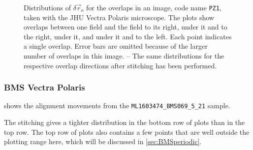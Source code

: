 \documentclass{article}
\begin{document}
\begin{figure}[ht]
\begin{subfigure}{0.24\linewidth}
		\caption{}
		\label{fig:stitchresultJHUPolaris1}
	\end{subfigure}
	\caption{Distributions of $\delta\vec{r}_o$ for the overlaps in an image, code name \texttt{PZ1}, taken with the JHU Vectra Polaris microscope.  The plots show overlaps between one field and the field  to its right,  under it and to the right,  under it, and  under it and to the left.  Each point indicates a single overlap.  Error bars are omitted because of the larger number of overlaps in this image.  -- The same distributions for the respective overlap directions after stitching has been performed.}
	\label{fig:alignmentresultsJHUPolaris}
\end{figure}

\subsubsection{BMS Vectra Polaris}

 shows the alignment movements from the \texttt{ML1603474\_BMS069\_5\_21} sample.

The stitching gives a tighter distribution in the bottom row of plots than in the top row.  The top row of plots also contains a few points that are well outside the plotting range here, which will be discussed in \cref{sec:BMSperiodic}.  
\end{document}
